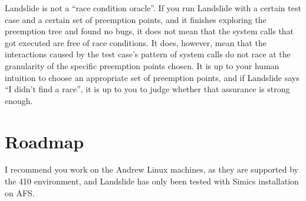 \documentclass{article}
\begin{document}
Landslide is not a ``race condition oracle''. If you run Landslide with a certain test case and a certain set of preemption points, and it finishes exploring the preemption tree and found no bugs, it does not mean that the system calls that got executed are free of race conditions.
It does, however, mean that the interactions caused by the test case's pattern of system calls do not race at the granularity of the specific preemption points chosen.
It is up to your human intuition to choose an appropriate set of preemption points, and if Landslide says ``I didn't find a race'', it is up to you to judge whether that assurance is strong enough.



\section{Roadmap}
\label{sec:stepbystep}

I recommend you work on the Andrew Linux machines, as they are supported by the 410 environment, and Landslide has only been tested with Simics installation on AFS.

\end{document}
